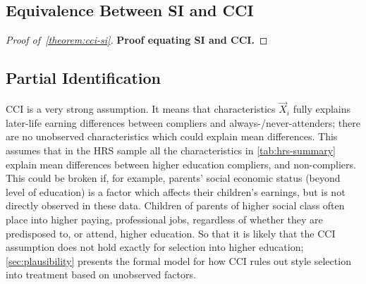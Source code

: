 \subsection{Equivalence Between SI and CCI}
\begin{proof}[Proof of~\autoref{theorem:cci-si}]
    \label{proof:cci-si}
    \textbf{Proof equating SI and CCI.}
\end{proof}

\subsection{Partial Identification}
\label{sec:partial}

CCI is a very strong assumption.
It means that characteristics $\vec X_i$ fully explains later-life earning differences between compliers and always-/never-attenders;
there are no unobserved characteristics which could explain mean differences.
This assumes that in the HRS sample all the characteristics in \autoref{tab:hrs-summary} explain mean differences between higher education compliers, and non-compliers.
This could be broken if, for example, parents' social economic status (beyond level of education) is a factor which affects their children's earnings, but is not directly observed in these data.
Children of parents of higher social class often place into higher paying, professional jobs, regardless of whether they are predisposed to, or attend, higher education.
So that it is likely that the CCI assumption does not hold exactly for selection into higher education;
\autoref{sec:plausibility} presents the formal model for how CCI rules out \cite{roy1951some} style selection into treatment based on unobserved factors.

